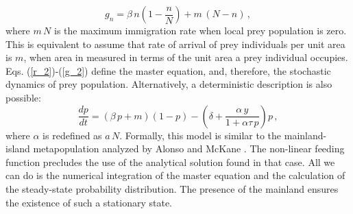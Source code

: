 \documentclass{article}
\begin{document}
\begin{equation}
g_{n} = \beta\,n\left(1-\frac{n}{N}\right)+m\,(N-n)\,,
\label{g_2}
\end{equation}
where $m\,N$ is the maximum immigration rate when local prey population is zero. This is equivalent to assume that rate of arrival of prey individuals per unit area is $m$, when area in measured in terms of the unit area a prey individual occupies. Eqs. (\ref{r_2})-(\ref{g_2}) define the master equation, and, therefore, the stochastic dynamics of prey population. Alternatively, a deterministic description is also possible:
\begin{equation}
\label{ex_3}
\frac{dp}{dt} = \left(\beta\,p+m\right)\left(1-p\right) - \left(\delta+\frac{\alpha\,y}{1+\alpha\tau\,p}\right)p\,,
\end{equation}
where $\alpha$ is redefined as $a\,N$. Formally, this model is similar to the mainland-island metapopulation analyzed by Alonso and McKane \cite{Alonso02}. The non-linear feeding function precludes the use of the analytical solution found in that case. All we can do is the numerical integration of the master equation and the calculation of the steady-state probability distribution. The presence of the mainland ensures the existence of such a stationary state.
\smallskip 
 
\end{document}
